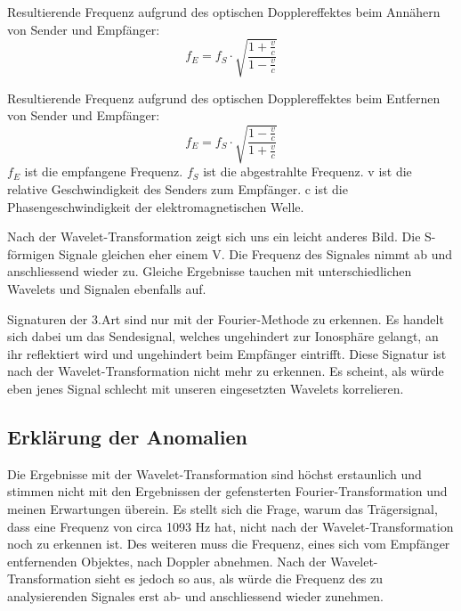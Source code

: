 \begin{refsection}
Resultierende Frequenz aufgrund des optischen Dopplereffektes beim Annähern von Sender und Empfänger:
\[
f_E
=
f_S\cdot\sqrt{\frac{1+\frac{v}{c}}{1-\frac{v}{c}}}
\]

Resultierende Frequenz aufgrund des optischen Dopplereffektes beim Entfernen von Sender und Empfänger:
\[
f_E
=
f_S\cdot\sqrt{\frac{1-\frac{v}{c}}{1+\frac{v}{c}}}
\]
\(f_E\) ist die empfangene Frequenz.
\(f_S\) ist die abgestrahlte Frequenz.
v ist die relative Geschwindigkeit des Senders zum Empfänger.
c ist die Phasengeschwindigkeit der elektromagnetischen Welle.

Nach der Wavelet-Transformation zeigt sich uns ein leicht anderes Bild.
Die S-förmigen Signale gleichen eher einem V.
Die Frequenz des Signales nimmt ab und anschliessend wieder zu.
Gleiche Ergebnisse tauchen mit unterschiedlichen Wavelets und Signalen ebenfalls auf.

Signaturen der 3.Art sind nur mit der Fourier-Methode zu erkennen.
Es handelt sich dabei um das Sendesignal, welches ungehindert zur Ionosphäre gelangt, an ihr reflektiert wird und ungehindert beim Empfänger eintrifft.
Diese Signatur ist nach der Wavelet-Transformation nicht mehr zu erkennen.
Es scheint, als würde eben jenes Signal schlecht mit unseren eingesetzten Wavelets korrelieren. 

\newpage
\subsection{Erklärung der Anomalien}
Die Ergebnisse mit der Wavelet-Transformation sind höchst erstaunlich und stimmen nicht mit den Ergebnissen der gefensterten Fourier-Transformation und meinen Erwartungen überein.
Es stellt sich die Frage, warum das Trägersignal, dass eine Frequenz von circa 1093 Hz hat, nicht nach der Wavelet-Transformation noch zu erkennen ist.
Des weiteren muss die Frequenz, eines sich vom Empfänger entfernenden Objektes, nach Doppler abnehmen.
Nach der Wavelet-Transformation sieht es jedoch so aus, als würde die Frequenz des zu analysierenden Signales erst ab- und anschliessend wieder zunehmen.


\end{refsection}
